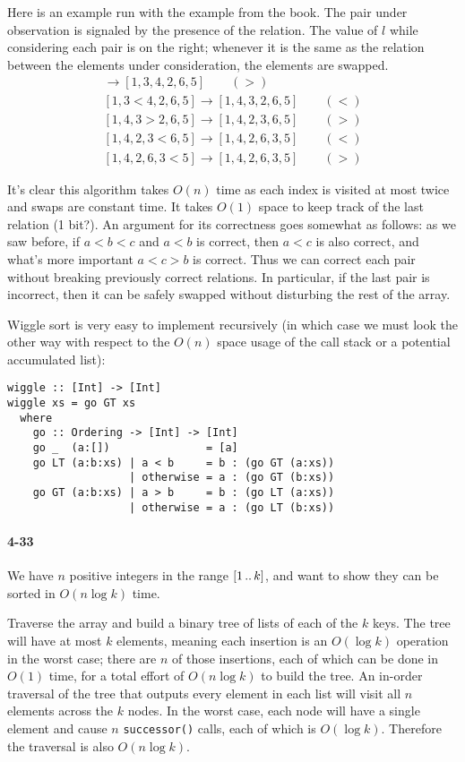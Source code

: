 \documentclass{report}
\newcommand{\li}{\lstinline}
\newcommand{\ldotsTwo}{%
 \mathinner{{\ldotp}{\ldotp}}%
}
\begin{document}
Here is an example run with the example from the book. The pair under observation is signaled by the presence of the relation. The value of $l$ while considering each pair is on the right; whenever it is the same as the relation between the elements under consideration, the elements are swapped.
\begin{gather*}
	[3 > 1,4,2,6,5] \to [1,3,4,2,6,5] \qquad (>)\\
	[1,3 < 4,2,6,5] \to [1,4,3,2,6,5] \qquad (<)\\
	[1,4,3 > 2,6,5] \to [1,4,2,3,6,5] \qquad (>)\\
	[1,4,2,3 < 6,5] \to [1,4,2,6,3,5] \qquad (<)\\
	[1,4,2,6,3 < 5] \to [1,4,2,6,3,5] \qquad (>)
\end{gather*}

It's clear this algorithm takes $O(n)$ time as each index is visited at most twice and swaps are constant time. It takes $O(1)$ space to keep track of the last relation (1 bit?). An argument for its correctness goes somewhat as follows: as we saw before, if $a < b < c$ and $a < b$ is correct, then $a < c$ is also correct, and what's more important $a < c > b$ is correct. Thus we can correct each pair without breaking previously correct relations. In particular, if the last pair is incorrect, then it can be safely swapped without disturbing the rest of the array.

\smallskip

Wiggle sort is very easy to implement recursively (in which case we must look the other way with respect to the $O(n)$ space usage of the call stack or a potential accumulated list):
\begin{lstlisting}
wiggle :: [Int] -> [Int]
wiggle xs = go GT xs
  where
    go :: Ordering -> [Int] -> [Int]
    go _  (a:[])               = [a]
    go LT (a:b:xs) | a < b     = b : (go GT (a:xs))
                   | otherwise = a : (go GT (b:xs))
    go GT (a:b:xs) | a > b     = b : (go LT (a:xs))
                   | otherwise = a : (go LT (b:xs))
\end{lstlisting}

\paragraph{4-33} We have $n$ positive integers in the range $[1\ldotsTwo k]$, and want to show they can be sorted in $O(n\log k)$ time.

Traverse the array and build a binary tree of lists of each of the $k$ keys. The tree will have at most $k$ elements, meaning each insertion is an $O(\log k)$ operation in the worst case; there are $n$ of those insertions, each of which can be done in $O(1)$ time, for a total effort of $O(n\log k)$ to build the tree. An in-order traversal of the tree that outputs every element in each list will visit all $n$ elements across the $k$ nodes. In the worst case, each node will have a single element and cause $n$ \li!successor()! calls, each of which is $O(\log k)$. Therefore the traversal is also $O(n\log k)$.
\end{document}
